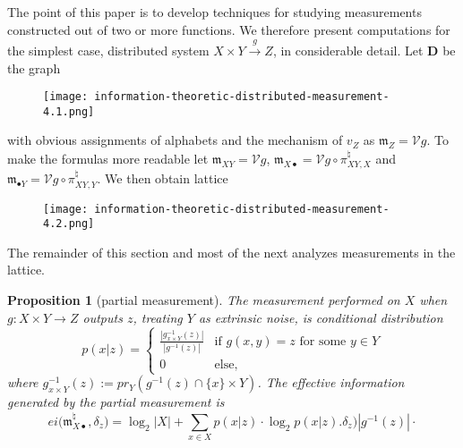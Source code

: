 \documentclass[12pt]{article}
\newcommand{\vecify}{{\mathcal V}}
\newcommand{\univ}{{\mathbf D}}
\newcommand{\fm}{{\mathfrak m}}
\newtheorem{prop}[thm]{Proposition}
\theoremstyle{remark}
\begin{document}
The point of this paper is to develop techniques for studying 
measurements constructed out of two or more functions. We 
therefore present computations for the simplest case, 
distributed system $X\times Y\xrightarrow{g}Z$, in considerable
detail. Let $\univ$ be the graph
\begin{figure}
 \centering
 \texttt{[image: information-theoretic-distributed-measurement-4.1.png]}
\end{figure}
with obvious assignments of alphabets and the mechanism of 
$v_Z$ as $\fm_Z=\vecify g$. To make the formulas more readable 
let $\fm_{XY}=\vecify g$, $\fm_{X\bullet}=
\vecify g\circ\pi^\natural_{XY,X}$ and  $\fm_{\bullet Y}=
\vecify g\circ\pi^\natural_{XY,Y}$. We then obtain lattice 
\begin{figure}
 \centering
 \texttt{[image: information-theoretic-distributed-measurement-4.2.png]}
\end{figure}
The remainder of this section and most of the next analyzes 
measurements in the lattice.

\begin{prop}
	[partial measurement]
	\label{t:confmeas}
	The measurement performed on $X$ when $g:X\times Y
    \rightarrow Z$  outputs $z$, treating $Y$ as extrinsic 
    noise, is conditional distribution
	\begin{equation}
		\label{e:conf-preimage}
		p(x|z) = \left\{\begin{matrix}
			\frac{|g_{x\times Y}^{-1}(z)|}{|g^{-1}(z)|} &
			\mbox{if } g(x,y)=z\mbox{ for some }y\in Y\\
			0 & \mbox{else,}
		\end{matrix}\right.
	\end{equation}
	where $g^{-1}_{x\times Y}(z):= pr_Y(g^{-1}(z)\cap \{x\}
    \times Y)$. The effective information generated by the
    partial measurement is
	\begin{equation}
		\label{e:conf-ei}
		ei\big(\fm_{X\bullet}^\natural,\delta_z\big) 		
		= \log_2|X|+\sum_{x\in X}p(x|z)\cdot
		\log_2 p(x|z).
\delta_z\big) 		
{|g^{-1}(z)|}\cdot
	\end{equation}
\end{prop}
\end{document}
